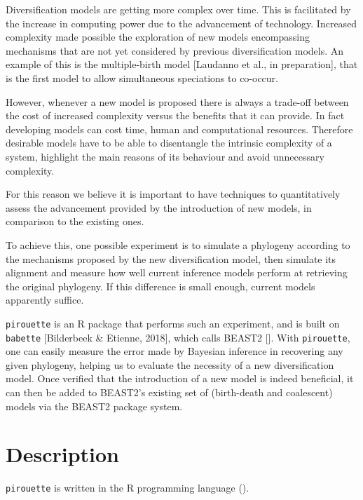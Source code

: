 \documentclass{article}
\begin{document}
Diversification models are getting more complex over time. 
This is facilitated by the increase in computing power due to the advancement of technology.
Increased complexity made possible the exploration of new models 
encompassing mechanisms that are not yet considered by previous diversification models. 
An example of this is the multiple-birth model [Laudanno et al., in preparation],
that is the first model to allow simultaneous speciations to co-occur.

However, whenever a new model is proposed there is always a trade-off 
between the cost of increased complexity versus the benefits that it can provide.
In fact developing models can cost time, human and computational resources.
Therefore desirable models have to be able to disentangle 
the intrinsic complexity of a system, 
highlight the main reasons of its behaviour and avoid unnecessary complexity. 

For this reason we believe it is important to have techniques 
to quantitatively assess the advancement provided by the introduction of new models, 
in comparison to the existing ones.

To achieve this, one possible experiment is to simulate a phylogeny 
according to the mechanisms proposed by the new diversification model, 
then simulate its alignment and measure how well current inference models perform 
at retrieving the original phylogeny.
If this difference is small enough, current models apparently
suffice.

\verb;pirouette; is an R package that performs such an experiment,
and is built on \verb;babette; [Bilderbeek \& Etienne, 2018], 
which calls BEAST2 [\cite{bouckaert2014beast}]. 
With \verb;pirouette;, one
can easily measure the error made by Bayesian inference in recovering
any given phylogeny, helping us to evaluate the necessity of a new diversification model.
Once verified that the introduction of a new model is indeed beneficial,
it can then be added to BEAST2's existing set of (birth-death and 
coalescent) models via the BEAST2 package system.

\section{Description}

\verb;pirouette; is written in the R programming language (\cite{R}).
\end{document}
